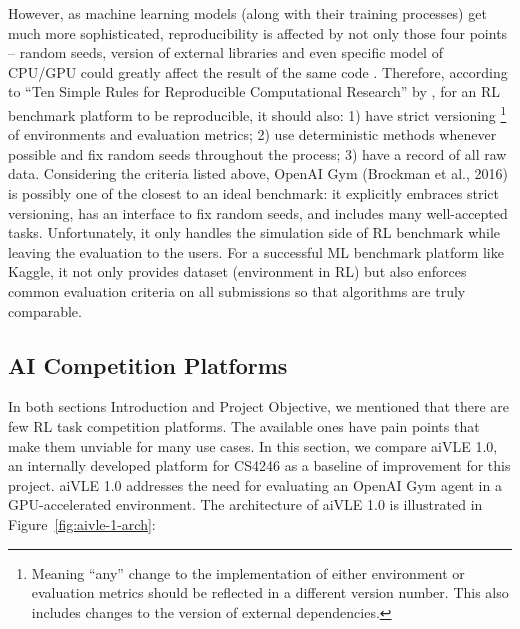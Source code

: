 \documentclass[fyp]{socreport}
\begin{document}
However, as machine learning models (along with their training processes) get much more sophisticated, reproducibility is affected by not only those four points – random seeds, version of external libraries and even specific model of CPU/GPU could greatly affect the result of the same code \cite{RN21}. Therefore, according to “Ten Simple Rules for Reproducible Computational Research” by \cite{RN22}, for an RL benchmark platform to be reproducible, it should also: 1) have strict versioning \footnote{Meaning “any” change to the implementation of either environment or evaluation metrics should be reflected in a different version number. This also includes changes to the version of external dependencies.} of environments and evaluation metrics; 2) use deterministic methods whenever possible and fix random seeds throughout the process; 3) have a record of all raw data.
Considering the criteria listed above, OpenAI Gym (Brockman et al., 2016) is possibly one of the closest to an ideal benchmark: it explicitly embraces strict versioning, has an interface to fix random seeds, and includes many well-accepted tasks. Unfortunately, it only handles the simulation side of RL benchmark while leaving the evaluation to the users. For a successful ML benchmark platform like Kaggle, it not only provides dataset (environment in RL) but also enforces common evaluation criteria on all submissions so that algorithms are truly comparable.

\subsection{AI Competition Platforms}
\label{ch:literature-review-related-work-ai-competition-platforms}
In both sections Introduction and Project Objective, we mentioned that there are few RL task competition platforms. The available ones have pain points that make them unviable for many use cases. In this section, we compare aiVLE 1.0, an internally developed platform for CS4246 as a baseline of improvement for this project.
aiVLE 1.0 addresses the need for evaluating an OpenAI Gym agent in a GPU-accelerated environment. The architecture of aiVLE 1.0 is illustrated in Figure~\ref{fig:aivle-1-arch}:
\end{document}
